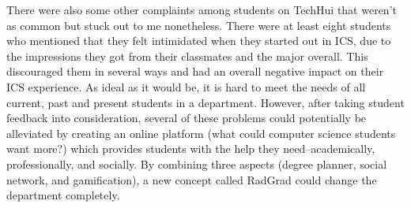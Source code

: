 There were also some other complaints among students on TechHui that weren’t as common but stuck out to me nonetheless. There were at least eight students who mentioned that they felt intimidated when they started out in ICS, due to the impressions they got from their classmates and the major overall. This discouraged them in several ways and had an overall negative impact on their ICS experience. 
As ideal as it would be, it is hard to meet the needs of all current, past and present students in a department. However, after taking student feedback into consideration, several of these problems could potentially be alleviated by creating an online platform (what could computer science students want more?) which provides students with the help they need--academically, professionally, and socially. By combining three aspects (degree planner, social network, and gamification), a new concept called RadGrad could change the department completely. 

